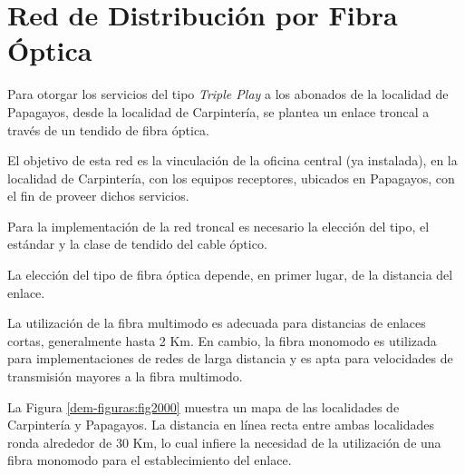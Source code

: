 \section{Red de Distribución por Fibra Óptica}


Para otorgar los servicios del tipo \textit{Triple Play} a los abonados de la localidad de Papagayos, desde la localidad de Carpintería, se plantea un enlace troncal a través de un tendido de fibra óptica.

El objetivo de esta red es la vinculación de la oficina central (ya instalada), en la localidad de Carpintería, con los equipos receptores, ubicados en Papagayos, con el fin de  proveer dichos servicios.


Para la implementación de la red troncal es necesario la elección del tipo, el estándar y la clase de tendido del cable óptico.


La elección del tipo de fibra óptica depende, en primer lugar, de la distancia del enlace.


La utilización de la fibra multimodo es adecuada para distancias de enlaces cortas, generalmente hasta 2 Km.
En cambio, la fibra monomodo es utilizada para implementaciones de redes de larga distancia y es apta para velocidades de transmisión mayores a la fibra multimodo.


La Figura \ref{dem-figuras:fig2000} muestra un mapa de las localidades de Carpintería y Papagayos. La distancia en línea recta  entre ambas localidades ronda alrededor de 30 Km, lo cual infiere la necesidad de la utilización de una fibra monomodo para el establecimiento del enlace.








